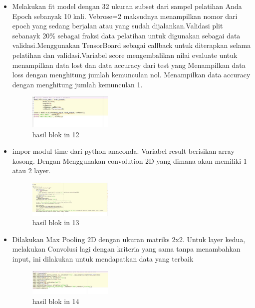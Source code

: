 \begin{enumerate}
\begin{itemize}
        \item  Melakukan fit model dengan 32 ukuran subset dari sampel pelatihan Anda Epoch sebanyak 10 kali. Vebrose=2 maksudnya menampilkan nomor dari epoch yang sedang berjalan atau yang sudah dijalankan.Validasi plit sebanayk 20\% sebagai fraksi data pelatihan untuk digunakan sebagai data validasi.Menggunakan TensorBoard sebagai callback untuk diterapkan selama pelatihan dan validasi.Variabel score mengembalikan nilai evaluate untuk menampilkan data lost dan data accuracy dari test yang Menampilkan data loss dengan menghitung jumlah kemunculan nol. Menampilkan data accuracy dengan menghitung jumlah kemunculan 1.
        \begin{figure}[H]
            \includegraphics[width=4cm]{figures/1174039/chapter7/praktek12.jpg}
            \centering
            \caption{hasil blok in 12}
        \end{figure}

        \item  impor modul time dari python anaconda. Variabel result berisikan array kosong. Dengan Menggunakan convolution 2D yang dimana akan memiliki 1 atau 2 layer.
        \begin{figure}[H]
            \includegraphics[width=4cm]{figures/1174039/chapter7/praktek13.jpg}
            \centering
            \caption{hasil blok in 13}
        \end{figure}

        \item  Dilakukan Max Pooling 2D dengan ukuran matriks 2x2. Untuk layer kedua, melakukan Convolusi lagi dengan kriteria yang sama tanpa menambahkan input, ini dilakukan untuk mendapatkan data yang terbaik
        \begin{figure}[H]
            \includegraphics[width=4cm]{figures/1174039/chapter7/praktek14.jpg}
            \centering
            \caption{hasil blok in 14}
        \end{figure}


\end{itemize}
\end{enumerate}
